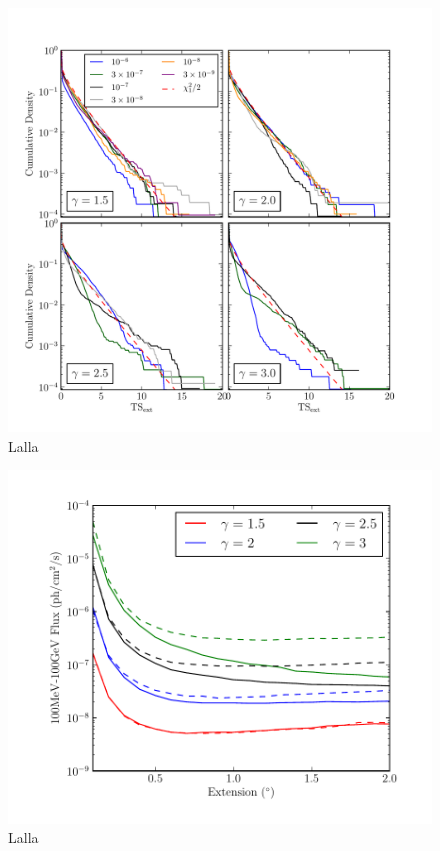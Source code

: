 \documentclass[preprint]{aastex}
\begin{document}
\clearpage

\clearpage
\begin{figure}
  \begin{center}
    \includegraphics{mc_plots/ts_ext_emin_1000.pdf}
    \end{center}
    \caption{Lalla}\label{ts_ext_mc}
  \end{figure}

\clearpage

\begin{figure}
  \begin{center}
    \includegraphics{mc_plots/index_sensitivity.pdf}
    \end{center}
    \caption{Lalla}\label{index_sensitivity}
  \end{figure}
\end{document}
